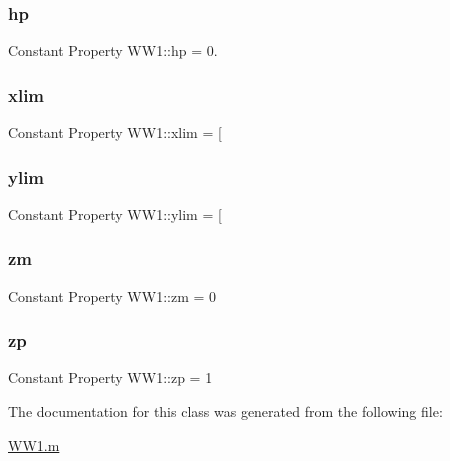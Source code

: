 \mbox{\label{class_w_w1_a8c584cf4ae74405204fa3e9dfb0d3e9f}} 
\subsubsection{\texorpdfstring{hp}{hp}}
{\footnotesize\ttfamily Constant Property W\+W1\+::hp = 0.}

\mbox{\label{class_w_w1_ad5168da0d150a664f9acd0c454a62396}} 
\subsubsection{\texorpdfstring{xlim}{xlim}}
{\footnotesize\ttfamily Constant Property W\+W1\+::xlim = \mbox{[}}

\mbox{\label{class_w_w1_a230be31b36e422b6b9563f92eed9ed12}} 
\subsubsection{\texorpdfstring{ylim}{ylim}}
{\footnotesize\ttfamily Constant Property W\+W1\+::ylim = \mbox{[}}

\mbox{\label{class_w_w1_af734ed004bfd8d879b0869537de2909e}} 
\subsubsection{\texorpdfstring{zm}{zm}}
{\footnotesize\ttfamily Constant Property W\+W1\+::zm = 0}

\mbox{\label{class_w_w1_af5eef7169f855e8397c32515243d4d61}} 
\subsubsection{\texorpdfstring{zp}{zp}}
{\footnotesize\ttfamily Constant Property W\+W1\+::zp = 1}



The documentation for this class was generated from the following file\+:\begin{DoxyCompactItemize}
\item 
\hyperlink{_w_w1_8m}{W\+W1.\+m}\end{DoxyCompactItemize}
